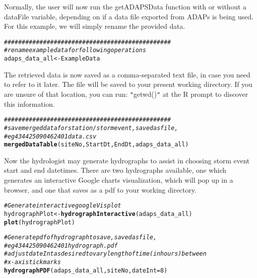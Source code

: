 \documentclass[a4paper,11pt]{article}\usepackage[]{graphicx}\usepackage[]{color}
\makeatletter
\newcommand{\hlnum}[1]{\textcolor[rgb]{0.686,0.059,0.569}{#1}}%
\newcommand{\hlcom}[1]{\textcolor[rgb]{0.678,0.584,0.686}{\textit{#1}}}%
\newcommand{\hlstd}[1]{\textcolor[rgb]{0.345,0.345,0.345}{#1}}%
\newcommand{\hlkwb}[1]{\textcolor[rgb]{0.69,0.353,0.396}{#1}}%
\newcommand{\hlkwc}[1]{\textcolor[rgb]{0.333,0.667,0.333}{#1}}%
\newcommand{\hlkwd}[1]{\textcolor[rgb]{0.737,0.353,0.396}{\textbf{#1}}}%
\newenvironment{kframe}{%
 \def\at@end@of@kframe{}%
 \ifinner\ifhmode%
  \def\at@end@of@kframe{\end{minipage}}%
  \begin{minipage}{\columnwidth}%
 \fi\fi%
 \def\FrameCommand##1{\hskip\@totalleftmargin \hskip-\fboxsep
 \colorbox{shadecolor}{##1}\hskip-\fboxsep
     \hskip-\linewidth \hskip-\@totalleftmargin \hskip\columnwidth}%
 \MakeFramed {\advance\hsize-\width
   \@totalleftmargin\z@ \linewidth\hsize
   \@setminipage}}%
 {\par\unskip\endMakeFramed%
 \at@end@of@kframe}
\newenvironment{knitrout}{}{} %
\makeatother
\begin{document}
Normally, the user will now run the getADAPSData function with or without a dataFile variable, depending on if a data file exported from ADAPs is being used. For this example, we will simply rename the provided data.

\begin{knitrout}
\color{fgcolor}\begin{kframe}
\begin{alltt}
\hlcom{###############################################}
\hlcom{# rename example data for following operations}
\hlstd{adaps_data_all} \hlkwb{<-} \hlstd{ExampleData}
\end{alltt}
\end{kframe}
\end{knitrout}


The retrieved data is now saved as a comma-separated text file, in case you need to refer to it later. The file will be saved to your present working directory. If you are unsure of that location, you can run: \texttt{"}getwd()\texttt{"} at the R prompt to discover this information.

\begin{knitrout}
\color{fgcolor}\begin{kframe}
\begin{alltt}
\hlcom{###############################################}
\hlcom{# save merged data for station/storm event, saved as file, }
\hlcom{# eg 434425090462401data.csv }
\hlkwd{mergedDataTable}\hlstd{(siteNo,StartDt,EndDt,adaps_data_all)}
\end{alltt}
\end{kframe}
\end{knitrout}


Now the hydrologist may generate hydrographs to assist in choosing storm event start and end datetimes. There are two hydrographs available, one which generates an interactive Google charts visualization, which will pop up in a browser, and one that saves as a pdf to your working directory.

\begin{knitrout}
\color{fgcolor}\begin{kframe}
\begin{alltt}
\hlcom{# Generate interactive googleVis plot}
\hlstd{hydrographPlot} \hlkwb{<-} \hlkwd{hydrographInteractive}\hlstd{(adaps_data_all)}
\hlkwd{plot}\hlstd{(hydrographPlot)}

\hlcom{# Generate pdf of hydrograph to save, saved as file, }
\hlcom{# eg 434425090462401hydrograph.pdf }
\hlcom{# adjust dateInt as desired to vary length of time (in hours) between }
\hlcom{# x-axis tick marks}
\hlkwd{hydrographPDF}\hlstd{(adaps_data_all,siteNo,}\hlkwc{dateInt}\hlstd{=}\hlnum{8}\hlstd{)}
\end{alltt}
\end{kframe}
\end{knitrout}
\end{document}
